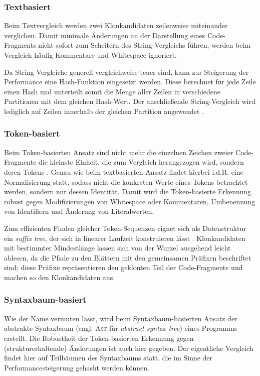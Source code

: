 \subsubsection{Textbasiert}

Beim Textvergleich werden zwei Klonkandidaten zeilenweise miteinander verglichen. Damit minimale Änderungen an der Darstellung eines Code-Fragments nicht sofort zum Scheitern des String-Vergleichs führen, werden beim Vergleich häufig Kommentare und Whitespace ignoriert.

Da String-Vergleiche generell vergleichweise teuer sind, kann zur Steigerung der Performance eine Hash-Funktion eingesetzt werden. Diese berechnet für jede Zeile einen Hash und unterteilt somit die Menge aller Zeilen in verschiedene Partitionen mit dem gleichen Hash-Wert. Der anschließende String-Vergleich wird lediglich auf Zeilen innerhalb der gleichen Partition angewendet \cite{koschke2007survey}.

\subsubsection{Token-basiert}

Beim Token-basierten Ansatz sind nicht mehr die einzelnen Zeichen zweier Code-Fragmente die kleinste Einheit, die zum Vergleich herangezogen wird, sondern deren Tokens \cite{baker1995finding}. Genau wie beim textbasierten Ansatz findet hierbei i.d.R. eine Normalisierung statt, sodass nicht die konkreten Werte eines Tokens betrachtet werden, sondern nur dessen Identität. Damit wird die Token-basierte Erkennung robust gegen Modifizierungen von Whitespace oder Kommentaren, Umbenennung von Identifiern und Änderung von Literalwerten.

Zum effizienten Finden gleicher Token-Sequenzen eignet sich als Datenstruktur ein \textit{suffix tree}, der sich in linearer Laufzeit konstruieren lässt \cite{koschke2013Similarity}. Klonkandidaten mit bestimmter Mindestlänge lassen sich von der Wurzel ausgehend leicht ablesen, da die Pfade zu den Blättern mit den gemeinsamen Präfixen beschriftet sind; diese Präfixe repräsentieren den geklonten Teil der Code-Fragmente und machen so den Klonkandidaten aus.


\subsubsection{Syntaxbaum-basiert}

Wie der Name vermuten lässt, wird beim Syntaxbaum-basierten Ansatz der abstrakte Syntaxbaum (engl. \textsc{Ast} für \textit{abstract syntax tree}) eines Programms erstellt. Die Robustheit der Token-basierten Erkennung gegen (strukturerhaltende) Änderungen ist auch hier gegeben. Der eigentliche Vergleich findet hier auf Teilbäumen des Syntaxbaums statt, die im Sinne der Performancesteigerung gehasht werden können.

